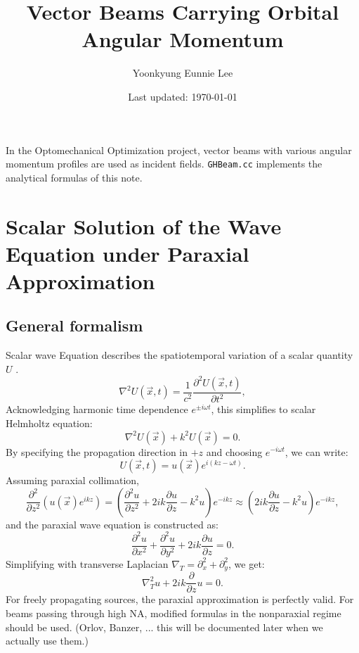 \documentclass[11pt,letterpaper]{article}
\author{Yoonkyung Eunnie Lee}
\title{Vector Beams Carrying Orbital Angular Momentum}
\date{Last updated: \today}
\newcommand{\p}{\partial}
\begin{document}
\maketitle
\thispagestyle{empty} 
In the Optomechanical Optimization project, vector beams with various angular momentum profiles are used as incident fields.  \texttt{GHBeam.cc} implements the analytical formulas of this note. 
\section{Scalar Solution of the Wave Equation under Paraxial Approximation}
\subsection{General formalism}
Scalar wave Equation describes the spatiotemporal variation of a scalar quantity $U$ .
\begin{equation}\label{eq:Wave}
    \nabla^2 U(\vec{x},t) = \frac{1}{c^2} \frac{\partial^2 U(\vec{x},t)}{\partial t^2},
\end{equation}
Acknowledging harmonic time dependence $e^{\pm i\omega t}$, this simplifies to scalar Helmholtz equation: 
\begin{equation}\label{eq:HelmHoltz}
    \nabla^2 U(\vec{x}) + k^2 U(\vec{x})=0.
\end{equation}
By specifying the propagation direction in $+z$ and choosing $e^{-i\omega t}$, we can write:
\begin{equation}
    U(\vec{x},t) = u(\vec{x}) e^{i(kz-\omega t)}.
\end{equation}
Assuming paraxial collimation, 
    \[ \frac{\p^2}{\p z^2} \left( u(\vec{x}) e^{ikz}\right)=
    \left( \frac{\p^2 u}{\p z^2} + 2ik \frac{\p u}{\p z} -k^2 u \right) e^{-ikz} 
    \approx \left( 2ik \frac{\p u}{\p z} -k^2 u \right) e^{-ikz}, 	\] 
and the paraxial wave equation is constructed as: 
\begin{equation}\label{eq:ParaxialWave0}
    \frac{\partial^2 u}{\partial x^2} + \frac{\partial^2 u}{\partial y^2} + 2ik \frac{\partial u}{\partial z} = 0.
\end{equation}
Simplifying with transverse Laplacian $\nabla_T=\p_x^2+\p_y^2$, we get:
\begin{equation}\label{eq:ParaxialWave}
    \boxed{ 
    \nabla_T^2 u + 2ik\frac{\p}{\p z}u=0.
    }
\end{equation}
For freely propagating sources, the paraxial approximation is perfectly valid. For beams passing through high NA, modified formulas in the nonparaxial regime should be used. (Orlov, Banzer, ... this will be documented later when we actually use them.)
\end{document}

